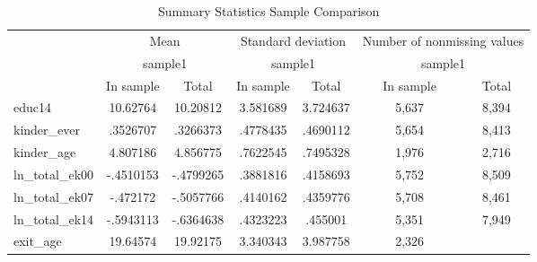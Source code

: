 \begin{table}[!h]
\caption{Summary Statistics Sample Comparison}
\begin{tabular}{lllllll}
\cline{1-7}
\multicolumn{1}{c}{} &
  \multicolumn{2}{|c}{Mean} &
  \multicolumn{2}{c}{Standard deviation} &
  \multicolumn{2}{c}{Number of nonmissing values} \\
\multicolumn{1}{c}{} &
  \multicolumn{2}{|c}{sample1} &
  \multicolumn{2}{c}{sample1} &
  \multicolumn{2}{c}{sample1} \\
\multicolumn{1}{c}{} &
  \multicolumn{1}{|c}{In sample} &
  \multicolumn{1}{c}{Total} &
  \multicolumn{1}{c}{In sample} &
  \multicolumn{1}{c}{Total} &
  \multicolumn{1}{c}{In sample} &
  \multicolumn{1}{c}{Total} \\
\cline{1-7}
\multicolumn{1}{l}{educ14} &
  \multicolumn{1}{|c}{10.62764} &
  \multicolumn{1}{c}{10.20812} &
  \multicolumn{1}{c}{3.581689} &
  \multicolumn{1}{c}{3.724637} &
  \multicolumn{1}{c}{5,637} &
  \multicolumn{1}{c}{8,394} \\
\multicolumn{1}{l}{kinder\_ever} &
  \multicolumn{1}{|c}{.3526707} &
  \multicolumn{1}{c}{.3266373} &
  \multicolumn{1}{c}{.4778435} &
  \multicolumn{1}{c}{.4690112} &
  \multicolumn{1}{c}{5,654} &
  \multicolumn{1}{c}{8,413} \\
\multicolumn{1}{l}{kinder\_age} &
  \multicolumn{1}{|c}{4.807186} &
  \multicolumn{1}{c}{4.856775} &
  \multicolumn{1}{c}{.7622545} &
  \multicolumn{1}{c}{.7495328} &
  \multicolumn{1}{c}{1,976} &
  \multicolumn{1}{c}{2,716} \\
\multicolumn{1}{l}{ln\_total\_ek00} &
  \multicolumn{1}{|c}{-.4510153} &
  \multicolumn{1}{c}{-.4799265} &
  \multicolumn{1}{c}{.3881816} &
  \multicolumn{1}{c}{.4158693} &
  \multicolumn{1}{c}{5,752} &
  \multicolumn{1}{c}{8,509} \\
\multicolumn{1}{l}{ln\_total\_ek07} &
  \multicolumn{1}{|c}{-.472172} &
  \multicolumn{1}{c}{-.5057766} &
  \multicolumn{1}{c}{.4140162} &
  \multicolumn{1}{c}{.4359776} &
  \multicolumn{1}{c}{5,708} &
  \multicolumn{1}{c}{8,461} \\
\multicolumn{1}{l}{ln\_total\_ek14} &
  \multicolumn{1}{|c}{-.5943113} &
  \multicolumn{1}{c}{-.6364638} &
  \multicolumn{1}{c}{.4323223} &
  \multicolumn{1}{c}{.455001} &
  \multicolumn{1}{c}{5,351} &
  \multicolumn{1}{c}{7,949} \\
\multicolumn{1}{l}{exit\_age} &
  \multicolumn{1}{|c}{19.64574} &
  \multicolumn{1}{c}{19.92175} &
  \multicolumn{1}{c}{3.340343} &
  \multicolumn{1}{c}{3.987758} &
  \multicolumn{1}{c}{2,326} &

\end{tabular}
\end{table}
